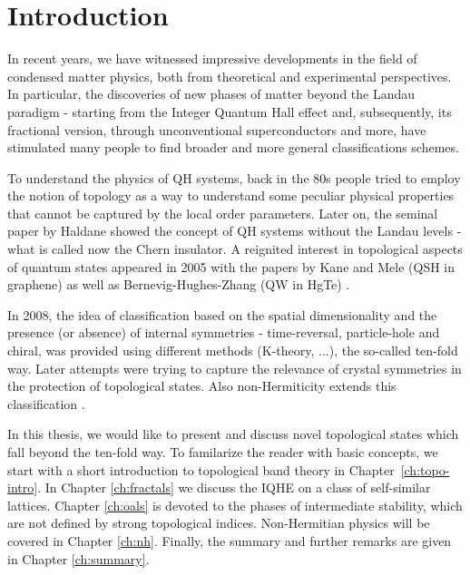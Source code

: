 \chapter{Introduction}
\label{ch:introduction}
In recent years, we have witnessed impressive developments in the field of condensed matter physics, both from theoretical and experimental perspectives. In particular, the discoveries of new phases of matter beyond the Landau paradigm - starting from the Integer Quantum Hall effect and, subsequently, its fractional version, through unconventional superconductors and more, have stimulated many people to find broader and more general classifications schemes. 

To understand the physics of QH systems, back in the 80s people tried to employ the notion of topology as a way to understand some peculiar physical properties that cannot be captured by the local order parameters. Later on, the seminal paper by Haldane showed the concept of QH systems without the Landau levels - what is called now the Chern insulator. A reignited interest in topological aspects of quantum states appeared in 2005 with the papers by Kane and Mele (QSH in graphene) as well as Bernevig-Hughes-Zhang (QW in HgTe) .


In 2008, the idea of classification based on the spatial dimensionality and the presence (or absence) of internal symmetries - time-reversal, particle-hole and chiral, was provided using different methods (K-theory, ...), the so-called ten-fold way. Later attempts were trying to capture the relevance of crystal symmetries in the protection of topological states. Also non-Hermiticity extends this classification .


In this thesis, we would like to present and discuss novel topological states which fall beyond the ten-fold way. To familarize the reader with basic concepts, we start with a short introduction to topological band theory in Chapter~\ref{ch:topo-intro}. In Chapter \ref{ch:fractals} we discuss the IQHE on a class of self-similar lattices. Chapter \ref{ch:oals} is devoted to the phases of intermediate stability, which are not defined by strong topological indices. Non-Hermitian physics will be covered in Chapter \ref{ch:nh}. Finally, the summary and further remarks are given in Chapter \ref{ch:summary}.
